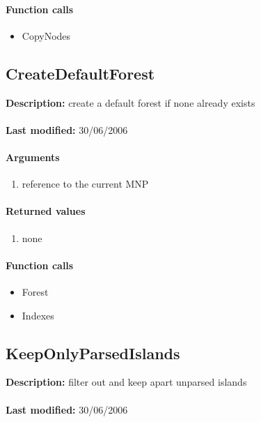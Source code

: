\paragraph{Function calls}
\begin{itemize}
\item CopyNodes
\end{itemize}

\subsection{CreateDefaultForest}
\textbf{Description:} create a default forest if none already exists\\
\\\textbf{Last modified:} 30/06/2006

\paragraph{Arguments}
\begin{enumerate}
\item reference to the current MNP
\end{enumerate}

\paragraph{Returned values}
\begin{enumerate}
\item none
\end{enumerate}

\paragraph{Function calls}
\begin{itemize}
\item Forest
\item Indexes
\end{itemize}

\subsection{KeepOnlyParsedIslands}
\textbf{Description:} filter out and keep apart unparsed islands\\
\\\textbf{Last modified:} 30/06/2006

